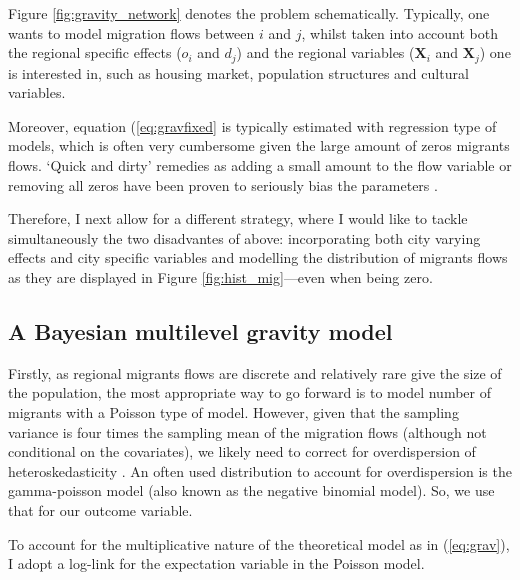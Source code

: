 \documentclass[fleqn,10pt]{SelfArx} %
\begin{document}
        Figure \ref{fig:gravity_network} denotes the problem schematically. Typically, one wants to model migration flows between $i$ and $j$, whilst taken into account both the regional specific effects ($o_i$ and $d_j$) and the regional variables ($\mathbf{X}_i$ and $\mathbf{X}_j$) one is interested  in, such as housing market, population structures and cultural variables. 
                  
        Moreover, equation
        (\ref{eq:gravfixed} is typically estimated with regression
        type of models, which is often very cumbersome given the large
        amount of zeros migrants flows. `Quick and dirty' remedies as adding a small amount to the flow variable or removing all zeros have been proven to seriously bias the parameters \citep{linders2006estimation, burger2009specification}.
        	

        Therefore, I next allow for a different strategy, where I
        would like to tackle simultaneously the two disadvantes of above:
        incorporating both city varying effects and city specific variables and
        modelling the distribution of migrants flows as they are
        displayed in Figure \ref{fig:hist_mig}---even when being zero.

        \subsection{A Bayesian multilevel gravity model}

        Firstly, as regional migrants flows are discrete and
        relatively rare give the size of the population, the most
        appropriate way to go forward is to model number of migrants
        with a Poisson type of model. However, given that the sampling
        variance is four times the sampling mean of the migration
        flows (although not conditional on the covariates), we likely
        need to correct for overdispersion of heteroskedasticity
        \citep[][states that heteroskedasticity (rather than the
        presence of too many zeros) is responsible for the main
        source of bias.]{silva2006log}. An often used distribution to
        account for overdispersion is the gamma-poisson model (also
        known as the negative binomial model). So, we use that for our
        outcome variable.

        To account for the multiplicative nature of the theoretical
        model as in (\ref{eq:grav}), I adopt a log-link for the
        expectation variable in the Poisson model.
\end{document}
